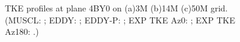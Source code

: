 \begin{figure}[t]
     \caption{TKE profiles at plane 4BY0 on (a)3M (b)14M (c)50M grid.  (MUSCL: \mline; EDDY: \eline; EDDY-P: \epline; EXP TKE Az0: \bluediam; EXP TKE Az180: \reddiam.)}
     \label{tke} 
\end{figure}
